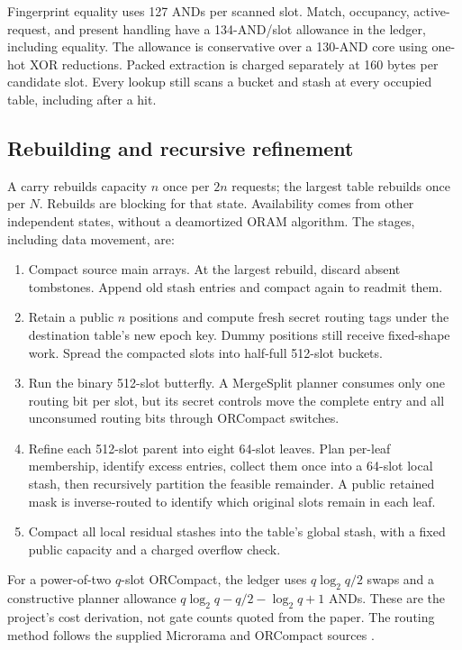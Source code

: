 \documentclass[11pt]{article}
\begin{document}
Fingerprint equality uses 127 ANDs per scanned slot. Match, occupancy,
active-request, and present handling have a 134-AND/slot allowance in the
ledger, including equality. The allowance is conservative over a 130-AND
core using one-hot XOR reductions. Packed extraction is charged separately
at 160 bytes per candidate slot. Every lookup still scans a bucket and
stash at every occupied table, including after a hit.

\subsection{Rebuilding and recursive refinement}
A carry rebuilds capacity $n$ once per $2n$ requests; the largest table
rebuilds once per $N$. Rebuilds are blocking for that state. Availability
comes from other independent states, without a deamortized ORAM algorithm.
The stages, including data movement, are:
\begin{enumerate}
\item Compact source main arrays. At the largest rebuild, discard absent
tombstones. Append old stash entries and compact again to readmit them.
\item Retain a public $n$ positions and compute fresh secret routing tags
under the destination table's new epoch key. Dummy positions still receive
fixed-shape work. Spread the compacted slots into half-full 512-slot buckets.
\item Run the binary 512-slot butterfly. A MergeSplit planner consumes only
one routing bit per slot, but its secret controls move the complete entry
and all unconsumed routing bits through ORCompact switches.
\item Refine each 512-slot parent into eight 64-slot leaves. Plan per-leaf
membership, identify excess entries, collect them once into a 64-slot local
stash, then recursively partition the feasible remainder. A public retained
mask is inverse-routed to identify which original slots remain in each leaf.
\item Compact all local residual stashes into the table's global stash,
with a fixed public capacity and a charged overflow check.
\end{enumerate}
For a power-of-two $q$-slot ORCompact, the ledger uses $q\log_2q/2$ swaps
and a constructive planner allowance $q\log_2q-q/2-\log_2q+1$ ANDs. These
are the project's cost derivation, not gate counts quoted from the paper.
The routing method follows the supplied Microrama and ORCompact sources
\cite{construction,orcompact}.
\end{document}
